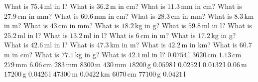 \documentclass[10pt]{exam}
\begin{document}
\extraheadheight{1in}
\headrule
\extrawidth{0.5in}
\extrafootheight{0.9in}

\large
\begin{multicols*}{2}
\begin{questions}
\question What is $75.4\,$ml in l?
\question What is $36.2\,$m in cm?
\question What is $11.3\,$mm in cm?
\question What is $27.9\,$cm in mm?
\question What is $60.6\,$mm in cm?
\question What is $28.3\,$cm in mm?
\question What is $8.3\,$km in m?
\question What is $43\,$cm in mm?
\question What is $18.2\,$kg in g?
\question What is $59.8\,$ml in l?
\question What is $25.2\,$ml in l?
\question What is $13.2\,$ml in l?
\question What is $6\,$cm in m?
\question What is $17.2\,$kg in g?
\question What is $42.6\,$ml in l?
\question What is $47.3\,$km in m?
\question What is $42.2\,$m in km?
\question What is $60.7\,$m in cm?
\question What is $77.1\,$kg in g?
\question What is $42.1\,$ml in l?
\question $0.0754\,$l
\question $3620\,$cm
\question $1.13\,$cm
\question $279\,$mm
\question $6.06\,$cm
\question $283\,$mm
\question $8300\,$m
\question $430\,$mm
\question $18200\,$g
\question $0.0598\,$l
\question $0.0252\,$l
\question $0.0132\,$l
\question $0.06\,$m
\question $17200\,$g
\question $0.0426\,$l
\question $47300\,$m
\question $0.0422\,$km
\question $6070\,$cm
\question $77100\,$g
\question $0.0421\,$l
\end{questions}
\end{multicols*}
\end{document}
